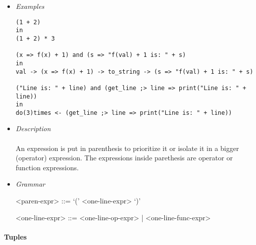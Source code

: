 \documentclass{article}
\begin{document}
\begin{itemize}

\item \textit{Examples}
\begin{verbatim}
(1 + 2)
in
(1 + 2) * 3

(x => f(x) + 1) and (s => "f(val) + 1 is: " + s)
in
val -> (x => f(x) + 1) -> to_string -> (s => "f(val) + 1 is: " + s)

("Line is: " + line) and (get_line ;> line => print("Line is: " + line))
in
do(3)times <- (get_line ;> line => print("Line is: " + line))
\end{verbatim}

\item \textit{Description} \\\\
An expression is put in parenthesis to prioritize it or isolate it in a bigger
(operator) expression. The expressions inside parethesis are operator
or function expressions.

\item \textit{Grammar}
\begin{grammar}
<paren-expr> ::= `(' <one-line-expr> `)' 

<one-line-expr> ::= <one-line-op-expr> | <one-line-func-expr>\\
\end{grammar}

\end{itemize}

\paragraph{Tuples}
\end{document}
